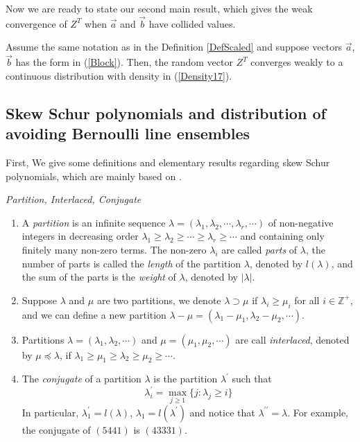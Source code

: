 Now we are ready to state our second main result, which gives the weak convergence of $Z^{T}$ when $\vec{a}$ and $\vec{b}$ have collided values.
\begin{proposition}{\label{WeakConvCollide}}
Assume the same notation as in the Definition \ref{DefScaled} and suppose vectors $\vec{a}$, $\vec{b}$ has the form in (\ref{Block}). Then, the random vector $Z^{T}$ converges weakly to a continuous distribution with density in (\ref{Density17}).
\end{proposition}

\subsection{Skew Schur polynomials and distribution of avoiding Bernoulli line ensembles}{\label{SkewSchurPoly}}
First, We give some definitions and elementary results regarding skew Schur polynomials, which are mainly based on \cite[Chapter 1]{Mac}.
\begin{definition}{\label{DefPar}} \emph{Partition, Interlaced, Conjugate}
\begin{enumerate}
	\item A \emph{partition} is an infinite sequence $\lambda=(\lambda_{1}, \lambda_{2}, \cdots, \lambda_{r}, \cdots)$ of non-negative integers in decreasing order $\lambda_{1}\geq \lambda_{2}\geq \cdots\geq \lambda_{r}\geq \cdots$ and containing only finitely many non-zero terms. The non-zero $\lambda_{i}$ are called \emph{parts} of $\lambda$, the number of parts is called the \emph{length} of the partition $\lambda$, denoted by $l(\lambda)$, and the sum of the parts is the \emph{weight} of $\lambda$, denoted by $|\lambda|$.
	\item Suppose $\lambda$ and $\mu$ are two partitions, we denote $\lambda\supset\mu$ if $\lambda_{i}\geq \mu_{i}$ for all $i\in \mathbb{Z}^{+}$, and we can define a new partition $\lambda-\mu=(\lambda_{1}-\mu_{1},\lambda_{2}-\mu_{2},\cdots)$.
	\item Partitions $\lambda=(\lambda_{1}, \lambda_{2},\cdots)$ and $\mu=(\mu_{1}, \mu_{2},\cdots)$ are call \emph{interlaced}, denoted by $\mu\preceq \lambda$, if $\lambda_1\geq \mu_1\geq \lambda_2\geq \mu_2\geq\cdots$.
	\item The \emph{conjugate} of a partition $\lambda$ is the partition $\lambda^{\prime}$ such that
	\begin{equation*}
		\lambda^{\prime}_{i}=\max_{j\geq 1}\{j:\lambda_{j}\geq i\}
	\end{equation*}
	In particular, $\lambda_{1}^{\prime}=l(\lambda)$, $\lambda_{1}=l(\lambda^{\prime})$ and notice that $\lambda^{\prime\prime}=\lambda$. For example, the conjugate of $(5441)$ is $(43331)$.
\end{enumerate}
\end{definition}

